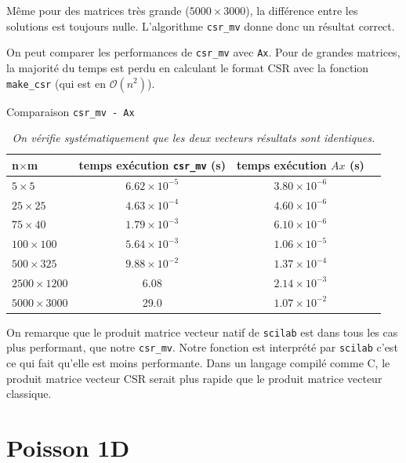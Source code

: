\documentclass{article}
\begin{document}
Même pour des matrices très grande (\(5000\times3000\)), la différence entre les solutions est toujours nulle. L'algorithme \texttt{csr\_mv} donne donc un résultat correct.

On peut comparer les performances de \texttt{csr\_mv} avec \texttt{Ax}. Pour de grandes matrices, la majorité du temps est perdu en calculant le format CSR avec la fonction \texttt{make\_csr} (qui est en \(\mathcal{O}(n^2)\)). 

\begin{table}[H]
\centering
\caption{Comparaison \texttt{csr\_mv - Ax}}
\renewcommand*\arraystretch{1.3}
\begin{tabular}{|l|c|c|c|}
  \hline
  n\(\times\)m & temps exécution \texttt{csr\_mv} (s) & temps exécution \(Ax\) (s) \\
  \hline
	\(5 \times 5\)		&	\(6.62 \times 10^{-5}\)	&	\(3.80 \times 10^{-6}\)	\\
	\(25 \times 25\)	&	\(4.63 \times 10^{-4}\)	&	\(4.60 \times 10^{-6}\)	\\
	\(75 \times 40\)	&	\(1.79 \times 10^{-3}\)	&	\(6.10 \times 10^{-6}\)	\\
	\(100 \times 100\)	&	\(5.64 \times 10^{-3}\)	&	\(1.06 \times 10^{-5}\)	\\
	\(500 \times 325\)	&	\(9.88 \times 10^{-2}\)	&	\(1.37 \times 10^{-4}\)	\\
	\(2500 \times 1200\)&	6.08					&	\(2.14 \times 10^{-3}\)	\\
	\(5000 \times 3000\)&	29.0					&	\(1.07 \times 10^{-2}\)	\\
  \hline
\end{tabular}
\caption*{\textit{On vérifie systématiquement que les deux vecteurs résultats sont identiques.}}
\end{table}

On remarque que le produit matrice vecteur natif de \texttt{scilab} est dans tous les cas plus performant, que notre \texttt{csr\_mv}. Notre fonction est interprété par \texttt{scilab} c'est ce qui fait qu'elle est moins performante. Dans un langage compilé comme C, le produit matrice vecteur CSR serait plus rapide que le produit matrice vecteur classique.

\section{Poisson 1D}
\end{document}
